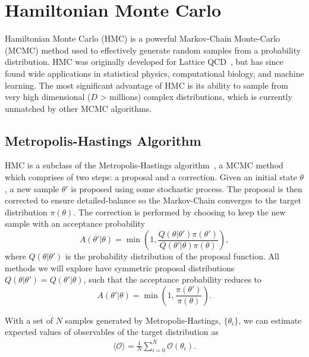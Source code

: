 \documentclass[11pt]{article}
\begin{document}
\section{Hamiltonian Monte Carlo}\label{sec:hamiltonian_monte_carlo}
    Hamiltonian Monte Carlo (HMC) is a powerful Markov-Chain Monte-Carlo (MCMC) method used to effectively generate
    random samples from a probability distribution.
    HMC was originally developed for Lattice QCD~\cite{HMC_Duane}, but has since found wide applications in statistical
    physics, computational biology, and machine learning.
    The most significant advantage of HMC is its ability to sample from very high dimensional ($D$ > millions)
    complex distributions, which is currently unmatched by other MCMC algorithms.

\subsection{Metropolis-Hastings Algorithm}\label{subsec:metropolis_hastings}
    HMC is a subclass of the Metropolis-Hastings algorithm~\cite{Metropolis_OG}, a MCMC method which comprises of two
    steps: a proposal and a correction.
    Given an initial state $\theta$, a new sample $\theta'$ is proposed using some stochastic process.
    The proposal is then corrected to ensure detailed-balance so the Markov-Chain converges to the
    target distribution $\pi(\theta)$.
    The correction is performed by choosing to keep the new sample with an acceptance probability
    \begin{equation}\label{eq:metropolis_hastings}
        A(\theta' | \theta) = \min \left(1, \frac{Q(\theta | \theta') \pi(\theta') }{Q(\theta' | \theta) \pi(\theta) } \right),
    \end{equation}
    where $Q(\theta | \theta')$ is the probability distribution of the proposal function.
    All methods we will explore have symmetric proposal distributions $Q(\theta | \theta') = Q(\theta' | \theta)$,
    such that the acceptance probability reduces to
    \begin{equation}\label{eq:metropolis}
        A(\theta' | \theta) = \min \left(1, \frac{\pi(\theta') }{\pi(\theta) } \right).
    \end{equation}

    With a set of $N$ samples generated by Metropolis-Hastings, $\{ \theta_i \}$, we can estimate expected values of observables
    of the target distribution as
    \begin{equation}\label{eq:mcmc_observable}
    \begin{aligned}
        \langle \mathcal{O} \rangle = \frac{1}{N}\sum_{i=0}^N \mathcal{O}(\theta_i).
    \end{aligned}
    \end{equation}
\end{document}
